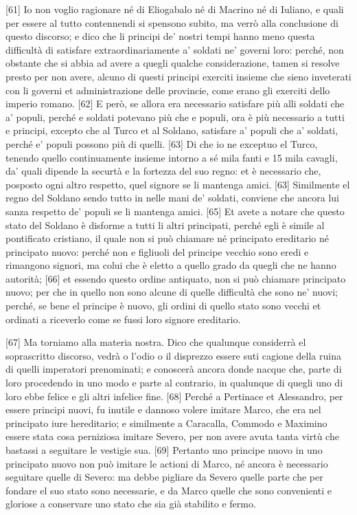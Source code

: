 {[}61{]} Io non voglio ragionare né di Eliogabalo né di Macrino né di
Iuliano, e quali per essere al tutto contennendi si spensono subito, ma
verrò alla conclusione di questo discorso; e dico che li principi de'
nostri tempi hanno meno questa difficultà di satisfare
extraordinariamente a' soldati ne' governi loro: perché, non obstante
che si abbia ad avere a quegli qualche considerazione, tamen si resolve
presto per non avere, alcuno di questi principi exerciti insieme che
sieno inveterati con li governi et administrazione delle provincie, come
erano gli exerciti dello imperio romano. {[}62{]} E però, se allora era
necessario satisfare più alli soldati che a' populi, perché e soldati
potevano più che e populi, ora è più necessario a tutti e principi,
excepto che al Turco et al Soldano, satisfare a' populi che a' soldati,
perché e' populi possono più di quelli. {[}63{]} Di che io ne exceptuo
el Turco, tenendo quello continuamente insieme intorno a sé  mila
fanti e 15 mila cavagli, da' quali dipende la securtà e la fortezza del
suo regno: et è necessario che, posposto ogni altro respetto, quel
signore se li mantenga amici. {[}63{]} Similmente el regno del Soldano
sendo tutto in nelle mani de' soldati, conviene che ancora lui sanza
respetto de' populi se li mantenga amici. {[}65{]} Et avete a notare che
questo stato del Soldano è disforme a tutti li altri principati, perché
egli è simile al pontificato cristiano, il quale non si può chiamare né
principato ereditario né principato nuovo: perché non e figliuoli del
principe vecchio sono eredi e rimangono signori, ma colui che è eletto a
quello grado da quegli che ne hanno autorità; {[}66{]} et essendo questo
ordine antiquato, non si può chiamare principato nuovo; per che in
quello non sono alcune di quelle difficultà che sono ne' nuovi; perché,
se bene el principe è nuovo, gli ordini di quello stato sono vecchi et
ordinati a riceverlo come se fussi loro signore ereditario.

\quebra

{[}67{]} Ma torniamo alla materia nostra. Dico che qualunque considerrà
el soprascritto discorso, vedrà o l'odio o il disprezzo essere suti
cagione della ruina di quelli imperatori prenominati; e conoscerà ancora
donde nacque che, parte di loro procedendo in uno modo e parte al
contrario, in qualunque di quegli uno di loro ebbe felice e gli altri
infelice fine. {[}68{]} Perché a Pertinace et Alessandro, per essere
principi nuovi, fu inutile e dannoso volere imitare Marco, che era nel
principato iure hereditario; e similmente a Caracalla, Commodo e
Maximino essere stata cosa perniziosa imitare Severo, per non avere
avuta tanta virtù che bastassi a seguitare le vestigie sua. {[}69{]}
Pertanto uno principe nuovo in uno principato nuovo non può imitare le
actioni di Marco, né ancora è necessario seguitare quelle di Severo: ma
debbe pigliare da Severo quelle parte che per fondare el suo stato sono
necessarie, e da Marco quelle che sono convenienti e gloriose a
conservare uno stato che sia già stabilito e fermo.

